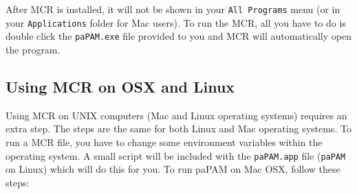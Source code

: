 \documentclass[11pt]{report}
\begin{document}
After MCR is installed, it will not be shown in your \texttt{All Programs} menu (or in your \texttt{Applications} folder for Mac users).  To run the MCR, all you have to do is double click the \texttt{paPAM.exe} file provided to you and MCR will automatically open the program.

\subsection{Using MCR on OSX and Linux}
Using MCR on UNIX computers (Mac and Linux operating systems) requires an extra step.  The steps are the same for both Linux and Mac operating systems.  To run a MCR file, you have to change some environment variables within the operating system.  A small script will be included with the \texttt{paPAM.app} file (\texttt{paPAM} on Linux) which will do this for you.  To run paPAM on Mac OSX, follow these steps:
\end{document}
